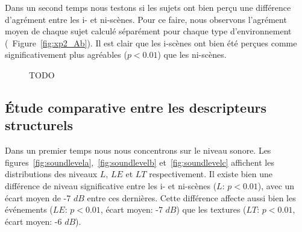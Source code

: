 Dans un second temps nous testons si les sujets ont bien perçu une différence d'agrément entre les i- et ni-scènes. Pour ce faire, nous observons l'agrément moyen de chaque sujet calculé séparément pour chaque type d'environnement (\Cf~Figure~\ref{fig:xp2_Ab}). Il est clair que les i-scènes ont bien été perçues comme significativement plus agréables ($p<0.01$) que les ni-scènes.

\begin{figure}[t]
        \myfloatalign
       \caption[TODO]{TODO}\label{fig:xp2_A}
\end{figure}
 
\subsection{Étude comparative entre les descripteurs structurels}

Dans un premier temps nous nous concentrons sur le niveau sonore. Les figures~\ref{fig:soundlevela},~\ref{fig:soundlevelb} et~\ref{fig:soundlevelc} affichent les distributions des niveaux $L$, $LE$ et $LT$ respectivement. Il existe bien une différence de niveau significative entre les i- et ni-scènes ($L$: $p<0.01$), avec un écart moyen de -7 $dB$ entre ces dernières. Cette différence affecte aussi bien les événements ($LE$: $p<0.01$, écart moyen: -7 $dB$) que les textures ($LT$: $p<0.01$, écart moyen: -6 $dB$). 

